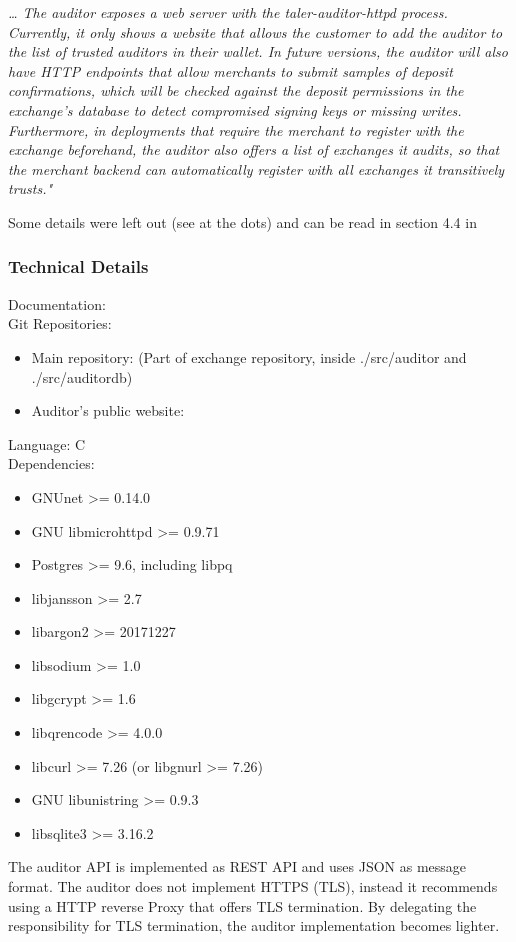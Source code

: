 \begin{center}
    \textit{
        \dots
        The auditor exposes a web server with the taler-auditor-httpd process.
        Currently, it only shows a website that allows the customer to add the auditor to the list of trusted auditors in their wallet. 
        In future versions, the auditor will also have HTTP endpoints that allow merchants to submit samples of deposit confirmations,  which  will  be  checked  against  the  deposit  permissions  in  the exchange’s  database  to  detect  compromised  signing  keys  or  missing  writes.
        Furthermore,  in  deployments  that  require  the  merchant  to  register  with  the exchange beforehand, the auditor also offers a list of exchanges it audits, so that the merchant backend can automatically register with all exchanges it transitively trusts."
    }
\end{center}
Some details were left out (see at the dots) and can be read in section 4.4 in \cite{dold:the-gnu-taler-system}

\subsubsection{Technical Details}
Documentation: \cite{taler-documentation:auditor-operator-manual} \\
Git Repositories:
\begin{itemize}
    \item Main repository: \cite{taler-git:exchange} (Part of exchange repository, inside ./src/auditor and ./src/auditordb)
    \item Auditor's public website: \cite{taler-git:auditor}
\end{itemize}
Language: C \\
Dependencies: 
\begin{itemize}
    \item GNUnet            >= 0.14.0
    \item GNU libmicrohttpd >= 0.9.71
    \item Postgres          >= 9.6, including libpq
    \item libjansson        >= 2.7
    \item libargon2         >= 20171227
    \item libsodium         >= 1.0
    \item libgcrypt         >= 1.6
    \item libqrencode       >= 4.0.0
    \item libcurl           >= 7.26 (or libgnurl >= 7.26)
    \item GNU libunistring  >= 0.9.3
    \item libsqlite3        >= 3.16.2
\end{itemize}
The auditor API is implemented as REST API and uses \ac{JSON} as message format.
The auditor does not implement HTTPS (TLS), instead it recommends using a HTTP reverse Proxy that offers TLS termination.
By delegating the responsibility for TLS termination, the auditor implementation becomes lighter.

